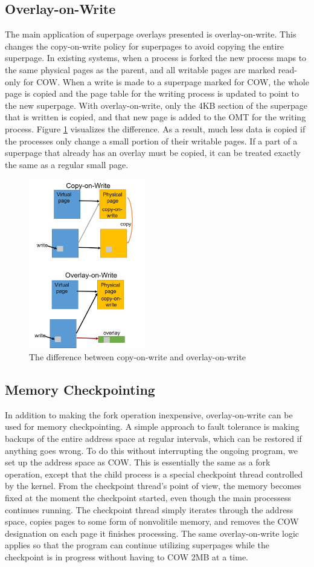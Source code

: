 \subsection{Overlay-on-Write}
The main application of superpage overlays presented is overlay-on-write. This changes the copy-on-write policy for superpages to avoid copying the entire superpage. In existing systems, when a process is forked the new process maps to the same physical pages as the parent, and all writable pages are marked read-only for COW. When a write is made to a superpage marked for COW, the whole page is copied and the page table for the writing process is updated to point to the new superpage. With overlay-on-write, only the 4KB section of the superpage that is written is copied, and that new page is added to the OMT for the writing process. Figure \ref{fig:oow} visualizes the difference. As a result, much less data is copied if the processes only change a small portion of their writable pages. If a part of a superpage that already has an overlay must be copied, it can be treated exactly the same as a regular small page.
\begin{figure}
    \centering
    \includegraphics[width=2in]{Figures/Picture2}
    \caption{The difference between copy-on-write and overlay-on-write}
    \label{fig:oow}
\end{figure}

\subsection{Memory Checkpointing}
In addition to making the fork operation inexpensive, overlay-on-write can be used for memory checkpointing. A simple approach to fault tolerance is making backups of the entire address space at regular intervals, which can be restored if anything goes wrong. To do this without interrupting the ongoing program, we set up the address space as COW. This is essentially the same as a fork operation, except that the child process is a special checkpoint thread controlled by the kernel. From the checkpoint thread's point of view, the memory becomes fixed at the moment the checkpoint started, even though the main processess continues running. The checkpoint thread simply iterates through the address space, copies pages to some form of nonvolitile memory, and removes the COW designation on each page it finishes processing. The same overlay-on-write logic applies so that the program can continue utilizing superpages while the checkpoint is in progress without having to COW 2MB at a time.


